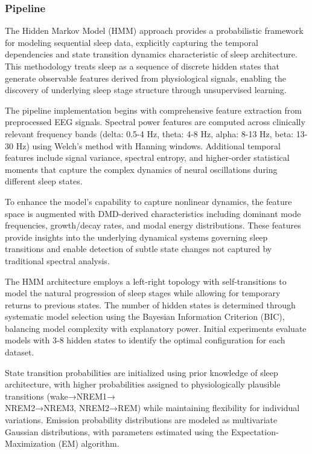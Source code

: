 \documentclass[a4paper,12pt,twoside]{article}
\begin{document}
\subsubsection{Pipeline}

The Hidden Markov Model (HMM) approach provides a probabilistic framework for modeling sequential sleep data, explicitly capturing the temporal dependencies and state transition dynamics characteristic of sleep architecture. This methodology treats sleep as a sequence of discrete hidden states that generate observable features derived from physiological signals, enabling the discovery of underlying sleep stage structure through unsupervised learning.

The pipeline implementation begins with comprehensive feature extraction from preprocessed EEG signals. Spectral power features are computed across clinically relevant frequency bands (delta: 0.5-4 Hz, theta: 4-8 Hz, alpha: 8-13 Hz, beta: 13-30 Hz) using Welch's method with Hanning windows. Additional temporal features include signal variance, spectral entropy, and higher-order statistical moments that capture the complex dynamics of neural oscillations during different sleep states.

To enhance the model's capability to capture nonlinear dynamics, the feature space is augmented with DMD-derived characteristics including dominant mode frequencies, growth/decay rates, and modal energy distributions. These features provide insights into the underlying dynamical systems governing sleep transitions and enable detection of subtle state changes not captured by traditional spectral analysis.

The HMM architecture employs a left-right topology with self-transitions to model the natural progression of sleep stages while allowing for temporary returns to previous states. The number of hidden states is determined through systematic model selection using the Bayesian Information Criterion (BIC), balancing model complexity with explanatory power. Initial experiments evaluate models with 3-8 hidden states to identify the optimal configuration for each dataset.

State transition probabilities are initialized using prior knowledge of sleep architecture, with higher probabilities assigned to physiologically plausible transitions (wake→NREM1→\\NREM2→NREM3, NREM2→REM) while maintaining flexibility for individual variations. Emission probability distributions are modeled as multivariate Gaussian distributions, with parameters estimated using the Expectation-Maximization (EM) algorithm.
\end{document}
